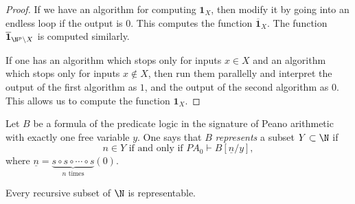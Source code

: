 \begin{page}
\setcounter{section}{3}
\setcounter{subsection}{4}
\setcounter{dfn}{29}
\label{portion:666}

\begin{proof}
If we have an algorithm for computing $\mathbf{1}_X$, then modify it by going into an endless loop if the output is $0$.
This computes the function $\overline{\mathbf{1}}_X$. The function $\overline{\mathbf{1}}_{\N^p \setminus X}$ is computed similarly.

If one has an algorithm which stops only for inputs $x \in X$ and an algorithm which stops only for inputs $x \notin X$, then run them parallelly
and interpret the output of the first algorithm as $1$, and the output of the second algorithm as $0$.
This allows us to compute the function $\mathbf{1}_X$.
\end{proof}



\end{page}

\begin{page}
\setcounter{section}{3}
\setcounter{subsection}{4}
\setcounter{dfn}{30}
\label{portion:668}

\begin{dfn}
Let $B$ be a formula of the predicate logic in the signature of Peano arithmetic with exactly one free variable $y$.
One says that $B$ \emph{represents} a subset $Y \subset \N$ if
\[
n \in Y \text{ if and only if }PA_0 \vdash B[\underline{n}/y],
\]
where $\underline{n} = \underbrace{s \circ s \circ \cdots \circ s}_{n\text{ times}}(0)$.
\end{dfn}

\end{page}

\begin{page}
\setcounter{section}{3}
\setcounter{subsection}{4}
\setcounter{dfn}{31}
\label{portion:671}

\begin{thm}
\label{thm:ReprThm}
Every recursive subset of $\N$ is representable.
\end{thm}

\end{page}

